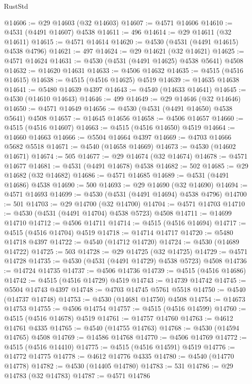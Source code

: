 \begin{lexlean}{RustStd}
\begin{coremodule}
{\begin{coremodule}
{{{{{{{{{{{{{{{{{{{{{{{{{{{{{{{{{{{{{{{{{{{{{{{{{{{{{{{@14606 := @29 @14603 (@32 @14603)
@14607 := @4571 @14606
@14610 := @4531 (@4491 @14607) @4538
@14611 := 496
@14614 := @29 @14611 (@32 @14611)
@14615 := @4571 @14614
@14620 := @4530 (@4531 (@4491 @14615) @4538 @4796)
@14621 := 497
@14624 := @29 @14621 (@32 @14621)
@14625 := @4571 @14624
@14631 := @4530 (@4531 (@4491 @14625) @4538 @5641) @4508
@14632 := @14620 @14631
@14633 := @4506 @14632
@14635 := @4515 (@4516 @14615)
@14638 := @4515 (@4516 @14625) @4519
@14639 := @14635 @14638
@14641 := @5480 @14639 @4397
@14643 := @4540 (@14633 @14641)
@14645 := @4530 (@14610 @14643)
@14646 := 499
@14649 := @29 @14646 (@32 @14646)
@14650 := @4571 @14649
@14656 := @4530 (@4531 (@4491 @14650) @4538 @5641) @4508
@14657 := @14645 @14656
@14658 := @4506 @14657
@14660 := @4515 (@4516 @14607)
@14663 := @4515 (@4516 @14650) @4519
@14664 := @14660 @14663
@14666 := @5504 @14664 @4397
@14669 := @4703 @14666 @5682 @5518
@14671 := @4540 (@14658 @14669)
@14673 := @4530 (@14602 @14671)
@14674 := 505
@14677 := @29 @14674 (@32 @14674)
@14678 := @4571 @14677
@14681 := @4531 (@4491 @14678) @4538
@14682 := 502
@14685 := @29 @14682 (@32 @14682)
@14686 := @4571 @14685
@14689 := @4531 (@4491 @14686) @4538
@14690 := 500
@14693 := @29 @14690 (@32 @14690)
@14694 := @4571 @14693
@14699 := @4530 (@4531 (@4491 @14694) @4538 @4796)
@14700 := 501
@14703 := @29 @14700 (@32 @14700)
@14704 := @4571 @14703
@14710 := @4530 (@4531 (@4491 @14704) @4538 @5723) @4508
@14711 := @14699 @14710
@14712 := @4506 @14711
@14714 := @4515 (@4516 @14694)
@14717 := @4515 (@4516 @14704) @4519
@14718 := @14714 @14717
@14720 := @5480 @14718 @4397
@14722 := @4540 (@14712 @14720)
@14724 := @4530 (@14689 @14722)
@14725 := 503
@14728 := @29 @14725 (@32 @14725)
@14729 := @4571 @14728
@14735 := @4530 (@4531 (@4491 @14729) @4538 @5723) @4508
@14736 := @14724 @14735
@14737 := @4506 @14736
@14739 := @4515 (@4516 @14686)
@14742 := @4515 (@4516 @14729) @4519
@14743 := @14739 @14742
@14745 := @5504 @14743 @4397
@14748 := @4703 @14745 @5761 @5518
@14750 := @4540 (@14737 @14748)
@14753 := @4530 (@14681 @14750) @4508
@14754 := @14673 @14753
@14755 := @4506 @14754
@14757 := @4515 (@4516 @14599)
@14760 := @4515 (@4516 @14678) @4519
@14761 := @14757 @14760
@14763 := @4612 @14761 @4335
@14765 := @4540 (@14755 @14763)
@14768 := @4530 (@14594 @14765) @4508
@14769 := @14586 @14768
@14770 := @4506 @14769
@14772 := @4515 (@4516 @14410)
@14775 := @4515 (@4516 @14591) @4519
@14776 := @14772 @14775
@14778 := @4612 @14776 @4335
@14780 := @4540 (@14770 @14778)
@14782 := @4530 (@14405 @14780)
@14783 := 531
@14786 := @29 @14783 (@32 @14783)
@14787 := @4571 @14786
}}}}}}}}}}}}}}}}}}}}}}}}}}}}}}}}}}}}}}}}}}}}}}}}}}}}}}}
\end{coremodule}}
\end{coremodule}
\end{lexlean}
